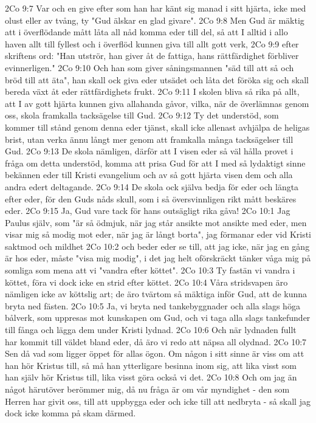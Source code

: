 2Co 9:7  Var och en give efter som han har känt sig manad i sitt hjärta, icke med olust eller av tvång, ty "Gud älskar en glad givare".
2Co 9:8  Men Gud är mäktig att i överflödande mått låta all nåd komma eder till del, så att I alltid i allo haven allt till fyllest och i överflöd kunnen giva till allt gott verk,
2Co 9:9  efter skriftens ord: "Han utströr, han giver åt de fattiga, hans rättfärdighet förbliver evinnerligen."
2Co 9:10  Och han som giver såningsmannen "säd till att så och bröd till att äta", han skall ock giva eder utsädet och låta det föröka sig och skall bereda växt åt eder rättfärdighets frukt.
2Co 9:11  I skolen bliva så rika på allt, att I av gott hjärta kunnen giva allahanda gåvor, vilka, när de överlämnas genom oss, skola framkalla tacksägelse till Gud.
2Co 9:12  Ty det understöd, som kommer till stånd genom denna eder tjänst, skall icke allenast avhjälpa de heligas brist, utan verka ännu långt mer genom att framkalla många tacksägelser till Gud.
2Co 9:13  De skola nämligen, därför att I visen eder så väl hålla provet i fråga om detta understöd, komma att prisa Gud för att I med så lydaktigt sinne bekännen eder till Kristi evangelium och av så gott hjärta visen dem och alla andra edert deltagande.
2Co 9:14  De skola ock själva bedja för eder och längta efter eder, för den Guds nåds skull, som i så översvinnligen rikt mått beskäres eder.
2Co 9:15  Ja, Gud vare tack för hans outsägligt rika gåva!
2Co 10:1  Jag Paulus själv, som "är så ödmjuk, när jag står ansikte mot ansikte med eder, men visar mig så modig mot eder, när jag är långt borta", jag förmanar eder vid Kristi saktmod och mildhet
2Co 10:2  och beder eder se till, att jag icke, när jag en gång är hos eder, måste "visa mig modig", i det jag helt oförskräckt tänker våga mig på somliga som mena att vi "vandra efter köttet".
2Co 10:3  Ty fastän vi vandra i köttet, föra vi dock icke en strid efter köttet.
2Co 10:4  Våra stridsvapen äro nämligen icke av köttslig art; de äro tvärtom så mäktiga inför Gud, att de kunna bryta ned fästen.
2Co 10:5  Ja, vi bryta ned tankebyggnader och alla slags höga bålverk, som uppresas mot kunskapen om Gud, och vi taga alla slags tankefunder till fånga och lägga dem under Kristi lydnad.
2Co 10:6  Och när lydnaden fullt har kommit till väldet bland eder, då äro vi redo att näpsa all olydnad.
2Co 10:7  Sen då vad som ligger öppet för allas ögon. Om någon i sitt sinne är viss om att han hör Kristus till, så må han ytterligare besinna inom sig, att lika visst som han själv hör Kristus till, lika visst göra också vi det.
2Co 10:8  Och om jag än något härutöver berömmer mig, då nu fråga är om vår myndighet - den som Herren har givit oss, till att uppbygga eder och icke till att nedbryta - så skall jag dock icke komma på skam därmed.
